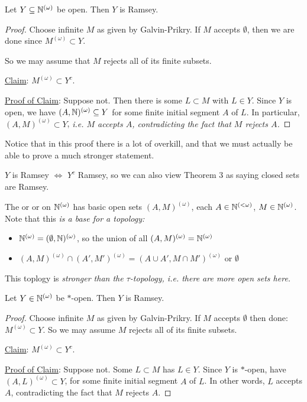 \documentclass[10pt]{article}
\newcommand{\bom}{{(\omega)}}
\newcommand{\blom}{{(<\omega)}}
\begin{document}
\begin{theorem}
    Let $Y \subset \N^\bom$ be open. Then $Y$ is Ramsey.
\end{theorem}
\begin{proof}
    Choose infinite $M$ as given by Galvin-Prikry. If $M$ accepts $\emptyset$, then we are done since $M^\bom\subset Y$.

    So we may assume that $M$ rejects all of its finite subsets.

    \underline{Claim}: $M^\bom \subset Y^c$.

    \underline{Proof of Claim}: Suppose not. Then there is some $L \subset M$ with $L \in Y$. Since $Y$ is open, we have $(A,\N)^\bom\subset Y$ for some finite initial segment $A$ of $L$. In particular, $(A,M)^\bom \subset Y$, \it{i.e.} $M$ accepts $A$, contradicting the fact that $M$ rejects $A$.
\end{proof}

Notice that in this proof there is a lot of overkill, and that we must actually be able to prove a much stronger statement.

\begin{remark*}
    $Y$ is Ramsey $\iff$ $Y^c$ Ramsey, so we can also view Theorem 3 as saying closed sets are Ramsey.
\end{remark*}

\begin{defin*}
    The  or  or  on $\N^\bom$ has basic open sets $(A,M)^\bom$, each $A \in \N^\blom$, $M \in \N^\bom$. Note that this \it{is} a base for a topology:
    \begin{itemize}
        \item $\N^\bom = (\emptyset,\N)^\bom$, so the union of all $(A,M)^\bom = \N^\bom$
        \item $(A,M)^\bom\cap (A',M')^\bom = (A\cup A',M\cap M')^\bom$ or $\emptyset$
    \end{itemize}
    This toplogy is \it{stronger} than the $\tau$-topology, \it{i.e.} there are more open sets here.
\end{defin*}

\begin{theorem*}[3.3']
    Let $Y \in \N^\bom$ be $\ast$-open. Then $Y$ is Ramsey.
\end{theorem*}
\begin{proof}
    Choose infinite $M$ as given by Galvin-Prikry. If $M$ accepts $\emptyset$ then done: $M^\bom \subset Y$. So we may assume $M$ rejects all of its finite subsets.

    \underline{Claim}: $M^\bom \subset Y^c$.
    
    \underline{Proof of Claim}: Suppose not. Some $L\subset M$ has $L \in Y$. Since $Y$ is $\ast$-open, have $(A,L)^\bom \subset Y$, for some finite initial segment $A$ of $L$. In other words, $L$ accepts $A$, contradicting the fact that $M$ rejects $A$.
\end{proof}
\end{document}

